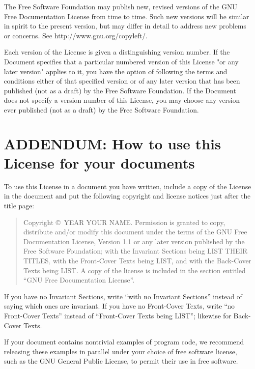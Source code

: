 \documentclass[a4paper]{report}
\begin{document}
The Free Software Foundation may publish new, revised versions
of the GNU Free Documentation License from time to time.  Such new
versions will be similar in spirit to the present version, but may
differ in detail to address new problems or concerns. See
http://www.gnu.org/copyleft/.

Each version of the License is given a distinguishing version number.
If the Document specifies that a particular numbered version of this
License "or any later version" applies to it, you have the option of
following the terms and conditions either of that specified version or
of any later version that has been published (not as a draft) by the
Free Software Foundation.  If the Document does not specify a version
number of this License, you may choose any version ever published (not
as a draft) by the Free Software Foundation.

\section*{ADDENDUM: How to use this License for your documents}

To use this License in a document you have written, include a copy of
the License in the document and put the following copyright and
license notices just after the title page:

\begin{quote}

      Copyright \copyright\ YEAR  YOUR NAME.
      Permission is granted to copy, distribute and/or modify this document
      under the terms of the GNU Free Documentation License, Version 1.1
      or any later version published by the Free Software Foundation;
      with the Invariant Sections being LIST THEIR TITLES, with the
      Front-Cover Texts being LIST, and with the Back-Cover Texts being LIST.
      A copy of the license is included in the section entitled ``GNU
      Free Documentation License''.

\end{quote}

If you have no Invariant Sections, write ``with no Invariant Sections''
instead of saying which ones are invariant.  If you have no
Front-Cover Texts, write ``no Front-Cover Texts'' instead of
``Front-Cover Texts being LIST''; likewise for Back-Cover Texts.

If your document contains nontrivial examples of program code, we
recommend releasing these examples in parallel under your choice of
free software license, such as the GNU General Public License,
to permit their use in free software.
\end{document}
